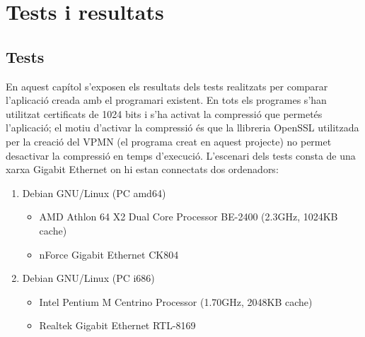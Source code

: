 \chapter{Tests i resultats}
\section{Tests}
En aquest capítol s'exposen els resultats dels tests realitzats per comparar l'aplicació creada amb el programari existent.
En tots els programes s'han utilitzat certificats de 1024 bits i s'ha activat la compressió que permetés l'aplicació; el motiu d'activar la compressió és que la llibreria OpenSSL utilitzada per la creació del VPMN (el programa creat en aquest projecte) no permet desactivar la compressió en temps d'execució.
L'escenari dels tests consta de una xarxa Gigabit Ethernet on hi estan connectats dos ordenadors:
\begin{enumerate}
\item Debian GNU/Linux (PC amd64)
\begin{itemize}
\item AMD Athlon 64 X2 Dual Core Processor BE-2400 (2.3GHz, 1024KB cache)
\item nForce Gigabit Ethernet CK804
\end{itemize}
\item Debian GNU/Linux (PC i686)
\begin{itemize}
\item Intel Pentium M Centrino Processor (1.70GHz, 2048KB cache)
\item Realtek Gigabit Ethernet RTL-8169
\end{itemize}
\end{enumerate}
